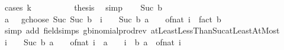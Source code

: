 \begin{isabellebody}
%
\isadelimproof
%
\endisadelimproof
%
\isatagproof
{}\isamarkupfalse%
\ {\isacharparenleft}{\kern0pt}cases\ k{\isacharparenright}{\kern0pt}\isanewline
\ \ \isamarkupfalse%
\ {}\isanewline
\ \ \isamarkupfalse%
\ \isamarkupfalse%
\ {\isacharquery}{\kern0pt}thesis\ \isamarkupfalse%
\ simp\isanewline
{}\isamarkupfalse%
\isanewline
\ \ \isamarkupfalse%
\ {\isacharparenleft}{\kern0pt}Suc\ b{\isacharparenright}{\kern0pt}\isanewline
\ \ \isamarkupfalse%
\ \isamarkupfalse%
\ {\isachardoublequoteopen}{\isacharparenleft}{\kern0pt}{\isacharparenleft}{\kern0pt}a\ {\isacharplus}{\kern0pt}\ {}{\isacharparenright}{\kern0pt}\ gchoose\ {\isacharparenleft}{\kern0pt}Suc\ {\isacharparenleft}{\kern0pt}Suc\ b{\isacharparenright}{\kern0pt}{\isacharparenright}{\kern0pt}{\isacharparenright}{\kern0pt}\ {\isacharequal}{\kern0pt}\ {\isacharparenleft}{\kern0pt}{\isasymProd}i\ {\isacharequal}{\kern0pt}\ {}\ {\isachardot}{\kern0pt}{\isachardot}{\kern0pt}\ Suc\ b{\isachardot}{\kern0pt}\ a\ {\isacharplus}{\kern0pt}\ {\isacharparenleft}{\kern0pt}{}\ {\isacharminus}{\kern0pt}\ of{\isacharunderscore}{\kern0pt}nat\ i{\isacharparenright}{\kern0pt}{\isacharparenright}{\kern0pt}\ {\isacharslash}{\kern0pt}\ fact\ {\isacharparenleft}{\kern0pt}b\ {\isacharplus}{\kern0pt}\ {}{\isacharparenright}{\kern0pt}{\isachardoublequoteclose}\isanewline
\ \ \ \ \isamarkupfalse%
\ {\isacharparenleft}{\kern0pt}simp\ add{\isacharcolon}{\kern0pt}\ field{\isacharunderscore}{\kern0pt}simps\ gbinomial{\isacharunderscore}{\kern0pt}prod{\isacharunderscore}{\kern0pt}rev\ atLeastLessThanSuc{\isacharunderscore}{\kern0pt}atLeastAtMost{\isacharparenright}{\kern0pt}\isanewline
\ \ \isamarkupfalse%
\ \isamarkupfalse%
\ {\isachardoublequoteopen}{\isacharparenleft}{\kern0pt}{\isasymProd}i\ {\isacharequal}{\kern0pt}\ {}\ {\isachardot}{\kern0pt}{\isachardot}{\kern0pt}\ Suc\ b{\isachardot}{\kern0pt}\ a\ {\isacharplus}{\kern0pt}\ {\isacharparenleft}{\kern0pt}{}\ {\isacharminus}{\kern0pt}\ of{\isacharunderscore}{\kern0pt}nat\ i{\isacharparenright}{\kern0pt}{\isacharparenright}{\kern0pt}\ {\isacharequal}{\kern0pt}\ {\isacharparenleft}{\kern0pt}a\ {\isacharplus}{\kern0pt}\ {}{\isacharparenright}{\kern0pt}\ {\isacharasterisk}{\kern0pt}\ {\isacharparenleft}{\kern0pt}{\isasymProd}i\ {\isacharequal}{\kern0pt}\ {}{\isachardot}{\kern0pt}{\isachardot}{\kern0pt}b{\isachardot}{\kern0pt}\ a\ {\isacharminus}{\kern0pt}\ of{\isacharunderscore}{\kern0pt}nat\ i{\isacharparenright}{\kern0pt}{\isachardoublequoteclose}\isanewline

\end{isabellebody}
